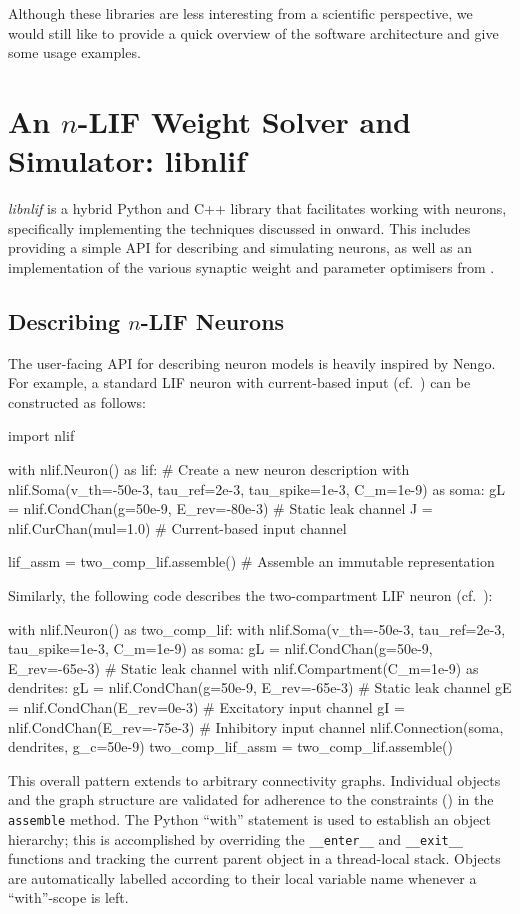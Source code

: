 Although these libraries are less interesting from a scientific perspective, we would still like to provide a quick overview of the software architecture and give some usage examples.

\section{An $n$-LIF Weight Solver and Simulator: libnlif}
\label{app:libnlif}

\emph{libnlif} is a hybrid Python and C++ library that facilitates working with \nlif neurons, specifically implementing the techniques discussed in  onward.
This includes providing a simple API for describing and simulating \nlif neurons, as well as an implementation of the various synaptic weight and parameter optimisers from .

\subsection{Describing $n$-LIF Neurons}

The user-facing API for describing neuron models is heavily inspired by Nengo.
For example, a standard LIF neuron with current-based input (cf.~) can be constructed as follows:
\begin{pythoncode}
import nlif

with nlif.Neuron() as lif: # Create a new neuron description 
	with nlif.Soma(v_th=-50e-3, tau_ref=2e-3, tau_spike=1e-3, C_m=1e-9) as soma:
		gL = nlif.CondChan(g=50e-9, E_rev=-80e-3) # Static leak channel
		J = nlif.CurChan(mul=1.0)                 # Current-based input channel

lif_assm = two_comp_lif.assemble() # Assemble an immutable representation
\end{pythoncode}
Similarly, the following code describes the two-compartment LIF neuron (cf.~):
\begin{pythoncode}
with nlif.Neuron() as two_comp_lif:
	with nlif.Soma(v_th=-50e-3, tau_ref=2e-3, tau_spike=1e-3, C_m=1e-9) as soma:
		gL = nlif.CondChan(g=50e-9, E_rev=-65e-3)  # Static leak channel
	with nlif.Compartment(C_m=1e-9) as dendrites:
		gL = nlif.CondChan(g=50e-9, E_rev=-65e-3)  # Static leak channel
		gE = nlif.CondChan(E_rev=0e-3)             # Excitatory input channel
		gI = nlif.CondChan(E_rev=-75e-3)           # Inhibitory input channel
	nlif.Connection(soma, dendrites, g_c=50e-9)
two_comp_lif_assm = two_comp_lif.assemble()
\end{pythoncode}
This overall pattern extends to arbitrary connectivity graphs.
Individual objects and the graph structure are validated for adherence to the \nlif constraints () in the \texttt{assemble} method.
The Python \enquote{with} statement is used to establish an object hierarchy; this is accomplished by overriding the \texttt{\_\_enter\_\_} and \texttt{\_\_exit\_\_} functions and tracking the current parent object in a thread-local stack.
Objects are automatically labelled according to their local variable name whenever a \enquote{with}-scope is left.

